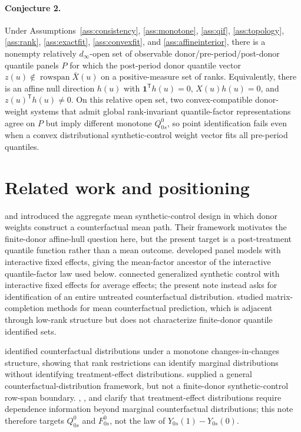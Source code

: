 \documentclass[11pt]{article}
\newcommand{\one}{\mathbf{1}}
\newcommand{\transpose}{\mathsf{T}}
\theoremstyle{definition}
\theoremstyle{plain}
\theoremstyle{remark}
\begin{document}
\paragraph{Conjecture 2.}\label{conj:escape}
Under Assumptions~\ref{ass:consistency}, \ref{ass:monotone}, \ref{ass:qif}, \ref{ass:topology}, \ref{ass:rank}, \ref{ass:exactfit}, \ref{ass:convexfit}, and \ref{ass:affineinterior}, there is a nonempty relatively \(d_\infty\)-open set of observable donor/pre-period/post-donor quantile panels \(P\) for which the post-period donor quantile vector \(z(u)\notin\operatorname{rowspan}\bar X(u)\) on a positive-measure set of ranks.  Equivalently, there is an affine null direction \(h(u)\) with \(\one^\transpose h(u)=0\), \(X(u)h(u)=0\), and \(z(u)^\transpose h(u)\ne0\).  On this relative open set, two convex-compatible donor-weight systems that admit global rank-invariant quantile-factor representations agree on \(P\) but imply different monotone \(Q^0_{0s}\), so point identification fails even when a convex distributional synthetic-control weight vector fits all pre-period quantiles.

\section{Related work and positioning}
\cite{AbadieGardeazabal2003} and \cite{AbadieDiamondHainmueller2010} introduced the aggregate mean synthetic-control design in which donor weights construct a counterfactual mean path.  Their framework motivates the finite-donor affine-hull question here, but the present target is a post-treatment quantile function rather than a mean outcome.  \cite{Bai2009IFE} developed panel models with interactive fixed effects, giving the mean-factor ancestor of the interactive quantile-factor law used below.  \cite{Xu2017GSC} connected generalized synthetic control with interactive fixed effects for average effects; the present note instead asks for identification of an entire untreated counterfactual distribution.  \cite{AtheyBayatiDoudchenkoImbensKhosravi2021MC} studied matrix-completion methods for mean counterfactual prediction, which is adjacent through low-rank structure but does not characterize finite-donor quantile identified sets.

\cite{AtheyImbens2006CIC} identified counterfactual distributions under a monotone changes-in-changes structure, showing that rank restrictions can identify marginal distributions without identifying treatment-effect distributions.  \cite{ChernozhukovFernandezValMelly2013} supplied a general counterfactual-distribution framework, but not a finite-donor synthetic-control row-span boundary.  \cite{FanYu2012PartialDID}, \cite{CallawayLi2019QTEDID}, and \cite{Callaway2021BoundsDTEPanel} clarify that treatment-effect distributions require dependence information beyond marginal counterfactual distributions; this note therefore targets \(Q^0_{0s}\) and \(F^0_{0s}\), not the law of \(Y_{0s}(1)-Y_{0s}(0)\).
\end{document}
